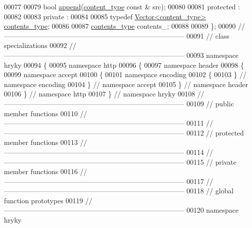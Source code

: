 \begin{DoxyCode}
00077 
00079     \textcolor{keywordtype}{bool} \hyperlink{classhryky_1_1http_1_1header_1_1accept_1_1encoding_1_1_entity_a0be94871da2d1a662ca422d222746330}{append}(\hyperlink{classhryky_1_1http_1_1header_1_1accept_1_1encoding_1_1content_1_1_entity}{content_type} \textcolor{keyword}{const} & src);
00080 
00081 \textcolor{keyword}{protected} :
00082 
00083 \textcolor{keyword}{private} :
00084 
00085     \textcolor{keyword}{typedef} \hyperlink{classhryky_1_1_vector}{Vector<content_type>} \hyperlink{classhryky_1_1_vector}{contents_type};
00086 
00087     \hyperlink{classhryky_1_1_vector}{contents_type} contents\_;
00088 
00089 \};
00090 \textcolor{comment}{//
      ------------------------------------------------------------------------------}
00091 \textcolor{comment}{// class specializations}
00092 \textcolor{comment}{//
      ------------------------------------------------------------------------------}
00093 \textcolor{keyword}{namespace }hryky
00094 \{
00095 \textcolor{keyword}{namespace }http
00096 \{
00097 \textcolor{keyword}{namespace }header
00098 \{
00099 \textcolor{keyword}{namespace }accept
00100 \{
00101 \textcolor{keyword}{namespace }encoding
00102 \{
00103 \} \textcolor{comment}{// namespace encoding}
00104 \} \textcolor{comment}{// namespace accept}
00105 \} \textcolor{comment}{// namespace header}
00106 \} \textcolor{comment}{// namespace http}
00107 \} \textcolor{comment}{// namespace hryky}
00108 \textcolor{comment}{//
      ------------------------------------------------------------------------------}
00109 \textcolor{comment}{// public member functions}
00110 \textcolor{comment}{//
      ------------------------------------------------------------------------------}
00111 \textcolor{comment}{//
      ------------------------------------------------------------------------------}
00112 \textcolor{comment}{// protected member functions}
00113 \textcolor{comment}{//
      ------------------------------------------------------------------------------}
00114 \textcolor{comment}{//
      ------------------------------------------------------------------------------}
00115 \textcolor{comment}{// private member functions}
00116 \textcolor{comment}{//
      ------------------------------------------------------------------------------}
00117 \textcolor{comment}{//
      ------------------------------------------------------------------------------}
00118 \textcolor{comment}{// global function prototypes}
00119 \textcolor{comment}{//
      ------------------------------------------------------------------------------}
00120 \textcolor{keyword}{namespace }hryky

\end{DoxyCode}
